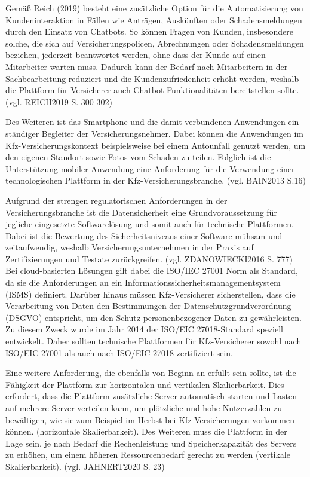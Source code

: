 Gemäß Reich (2019) besteht eine zusätzliche Option für die Automatisierung von Kundeninteraktion in Fällen wie Anträgen, Auskünften oder Schadensmeldungen durch den Einsatz von Chatbots. So können Fragen von Kunden, insbesondere solche, die sich auf Versicherungspolicen, Abrechnungen oder Schadensmeldungen beziehen, jederzeit beantwortet werden, ohne dass der Kunde auf einen Mitarbeiter warten muss. Dadurch kann der Bedarf nach Mitarbeitern in der Sachbearbeitung reduziert und die Kundenzufriedenheit erhöht werden, weshalb die Plattform für Versicherer auch Chatbot-Funktionalitäten bereitstellen sollte. (vgl. REICH2019 S. 300-302)

Des Weiteren ist das Smartphone und die damit verbundenen Anwendungen ein ständiger Begleiter der Versicherungsnehmer. Dabei können die Anwendungen im Kfz-Versicherungskontext beispielsweise bei einem Autounfall genutzt werden, um den eigenen Standort sowie Fotos vom Schaden zu teilen. Folglich ist die Unterstützung mobiler Anwendung eine Anforderung für die Verwendung einer technologischen Plattform in der Kfz-Versicherungsbranche. (vgl. BAIN2013 S.16)

Aufgrund der strengen regulatorischen Anforderungen in der Versicherungsbranche ist die Datensicherheit eine Grundvoraussetzung für jegliche eingesetzte Softwarelösung und somit auch für technische Plattformen. Dabei ist die Bewertung des Sicherheitsniveaus einer Software mühsam und zeitaufwendig, weshalb Versicherungsunternehmen in der Praxis auf Zertifizierungen und Testate zurückgreifen. (vgl. ZDANOWIECKI2016 S. 777) Bei cloud-basierten Lösungen gilt dabei die ISO/IEC 27001 Norm als  Standard, da sie die Anforderungen an ein Informationssicherheitsmanagementsystem (ISMS) definiert. Darüber hinaus müssen Kfz-Versicherer sicherstellen, dass die Verarbeitung von Daten den Bestimmungen der Datenschutzgrundverordnung (DSGVO) entspricht, um den Schutz personenbezogener Daten zu gewährleisten. Zu diesem Zweck wurde im Jahr 2014 der ISO/EIC 27018-Standard speziell entwickelt. Daher sollten technische Plattformen für Kfz-Versicherer sowohl nach ISO/EIC 27001 als auch nach ISO/EIC 27018 zertifiziert sein.

Eine weitere Anforderung, die ebenfalls von Beginn an erfüllt sein sollte, ist die Fähigkeit der Plattform zur horizontalen und vertikalen Skalierbarkeit. Dies erfordert, dass die Plattform zusätzliche Server automatisch starten und Lasten auf mehrere Server verteilen kann, um plötzliche und hohe Nutzerzahlen zu bewältigen, wie sie zum Beispiel im Herbst bei Kfz-Versicherungen vorkommen können. (horizontale Skalierbarkeit). Des Weiteren muss die Plattform in der Lage sein, je nach Bedarf die Rechenleistung und Speicherkapazität des Servers zu erhöhen, um einem höheren Ressourcenbedarf gerecht zu werden (vertikale Skalierbarkeit). (vgl. JAHNERT2020 S. 23)

